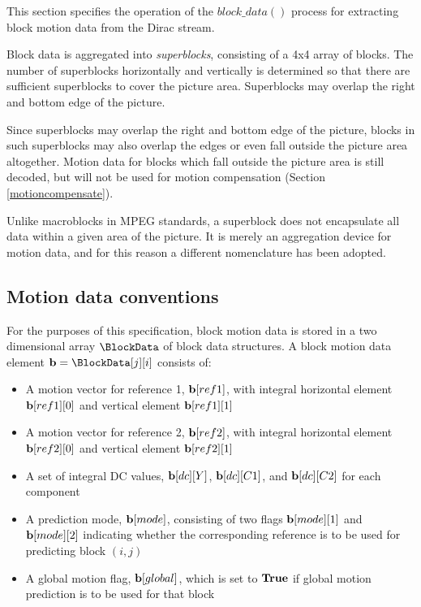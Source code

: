 
\label{motiondec}

This section specifies the operation of the $block\_data()$ process for extracting
block motion data from the Dirac stream. 

Block data is aggregated into {\em superblocks}, consisting of a 4x4 array of blocks. The number 
of superblocks horizontally and vertically is determined so that there are sufficient superblocks
to cover the picture area. Superblocks may overlap the right and bottom edge of the picture.

\begin{informative}
Since superblocks may overlap the right and bottom edge of the picture, blocks in such superblocks
may also overlap the edges or even fall outside the picture area altogether. Motion data for 
blocks which fall outside the picture area is still decoded, but will not be used for motion compensation 
(Section \ref{motioncompensate}). 

Unlike macroblocks in MPEG standards, a superblock does not encapsulate all data within a 
given area of the picture. It is merely an aggregation device for motion data, and for this reason
a different nomenclature has been adopted.
\end{informative}

\subsection{Motion data conventions}

\label{motionconventions}

For the purposes of this specification, block motion data is stored in a two dimensional array 
$\BlockData$ of block data structures. A block motion data element ${\bf b}=\BlockData[j][i]$ consists of:

\begin{itemize}
\item A motion vector for reference 1, ${\bf b}[ref1]$, with integral horizontal element ${\bf b}[ref1][0]$ and 
vertical element ${\bf b}[ref1][1]$
\item A motion vector for reference 2, ${\bf b}[ref2]$, with integral horizontal element ${\bf b}[ref2][0]$ and 
vertical element ${\bf b}[ref2][1]$
\item A set of integral DC values, ${\bf b}[dc][Y]$, ${\bf b}[dc][C1]$, and ${\bf b}[dc][C2]$ for each component
\item A prediction mode, ${\bf b}[mode]$, consisting of two flags ${\bf b}[mode][1]$ and ${\bf b}[mode][2]$ 
indicating whether the corresponding reference is to be used for predicting block $(i,j)$
\item A global motion flag, ${\bf b}[global]$, which is set to $\text{\bf{True}}$ if global motion prediction is to be used for
that block
\end{itemize}

